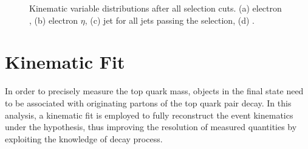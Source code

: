 \begin{figure}[!htp]
   \centering
   \hfill
   \caption{\label{fig:controlplots}Kinematic variable distributions after all selection cuts. (a) electron \pt, (b)
   electron $\eta$, (c) jet \pt for all jets passing the selection, (d) \MET.}
\end{figure}

\section{Kinematic Fit}
\label{s_top_mass:kinematic_fit}
In order to precisely measure the top quark mass, objects in the final state need to be associated with originating
partons of the top quark pair decay. In this analysis, a kinematic fit is employed to fully reconstruct the event
kinematics under the \ttbar hypothesis, thus improving the resolution of measured quantities by exploiting the knowledge
of decay process.

